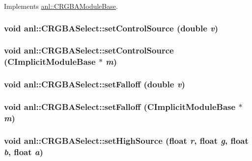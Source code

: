 Implements \hyperlink{classanl_1_1CRGBAModuleBase_afb6896d38ae92b9bb784fe5dc731ae67}{anl::CRGBAModuleBase}.\hypertarget{classanl_1_1CRGBASelect_ab5aa15768da36e53b8f2b31bae9df58a}{
\subsubsection[{setControlSource}]{\setlength{\rightskip}{0pt plus 5cm}void anl::CRGBASelect::setControlSource (double {\em v})}}
\label{classanl_1_1CRGBASelect_ab5aa15768da36e53b8f2b31bae9df58a}
\hypertarget{classanl_1_1CRGBASelect_aa956c2a5d0bbb3121f0a3f4adc3e3523}{
\subsubsection[{setControlSource}]{\setlength{\rightskip}{0pt plus 5cm}void anl::CRGBASelect::setControlSource ({\bf CImplicitModuleBase} $\ast$ {\em m})}}
\label{classanl_1_1CRGBASelect_aa956c2a5d0bbb3121f0a3f4adc3e3523}
\hypertarget{classanl_1_1CRGBASelect_add50fde82d09d70cb45719e82b860610}{
\subsubsection[{setFalloff}]{\setlength{\rightskip}{0pt plus 5cm}void anl::CRGBASelect::setFalloff (double {\em v})}}
\label{classanl_1_1CRGBASelect_add50fde82d09d70cb45719e82b860610}
\hypertarget{classanl_1_1CRGBASelect_a63f592c30dd15a8e98b31b6888d1f03e}{
\subsubsection[{setFalloff}]{\setlength{\rightskip}{0pt plus 5cm}void anl::CRGBASelect::setFalloff ({\bf CImplicitModuleBase} $\ast$ {\em m})}}
\label{classanl_1_1CRGBASelect_a63f592c30dd15a8e98b31b6888d1f03e}
\hypertarget{classanl_1_1CRGBASelect_a645a5e2d7644d7e532dcd184bbf2c483}{
\subsubsection[{setHighSource}]{\setlength{\rightskip}{0pt plus 5cm}void anl::CRGBASelect::setHighSource (float {\em r}, \/  float {\em g}, \/  float {\em b}, \/  float {\em a})}}
